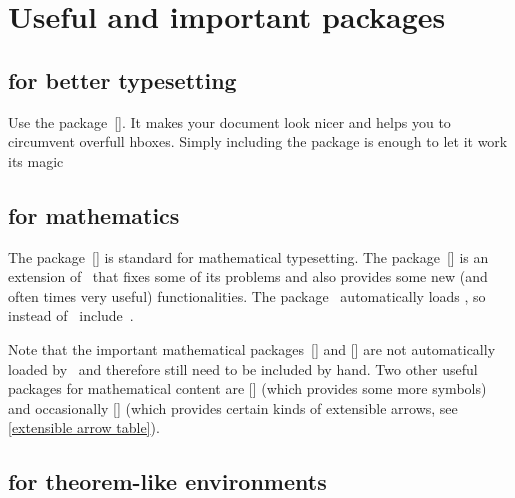 \chapter{Useful and important packages}





\section{ for better typesetting}

Use the package~[\packname].
It makes your document look nicer and helps you to circumvent overfull hboxes.
Simply including the package is enough to let it work its magic





\section{ for mathematics}

The package~[\packname] is standard for mathematical typesetting.
The package~[\packname] is an extension of~ that fixes some of its problems and also provides some new (and often times very useful) functionalities.
The package~ automatically loads , so instead of~ include~.

Note that the important mathematical packages~[\packname] and [\packname] are not automatically loaded by~ and therefore still need to be included by hand.
Two other useful packages for mathematical content are [\packname] (which provides some more symbols) and occasionally [\packname] (which provides certain kinds of extensible arrows, see \cref{extensible arrow table}).





\section{ for theorem-like environments}
\label{defining theorem-like environments}

